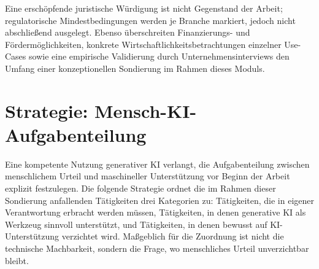 \documentclass[a4paper,11pt]{article}
\begin{document}
Eine erschöpfende juristische Würdigung ist nicht Gegenstand der Arbeit;
regulatorische Mindestbedingungen werden je Branche markiert, jedoch
nicht abschließend ausgelegt. Ebenso überschreiten Finanzierungs- und
Fördermöglichkeiten, konkrete Wirtschaftlichkeitsbetrachtungen einzelner
Use-Cases sowie eine empirische Validierung durch Unternehmensinterviews
den Umfang einer konzeptionellen Sondierung im Rahmen dieses Moduls.

\section{Strategie: Mensch-KI-Aufgabenteilung}

Eine kompetente Nutzung generativer KI verlangt, die Aufgabenteilung
zwischen menschlichem Urteil und maschineller Unterstützung vor Beginn
der Arbeit explizit festzulegen. Die folgende Strategie ordnet die im
Rahmen dieser Sondierung anfallenden Tätigkeiten drei Kategorien zu:
Tätigkeiten, die in eigener Verantwortung erbracht werden müssen,
Tätigkeiten, in denen generative KI als Werkzeug sinnvoll unterstützt,
und Tätigkeiten, in denen bewusst auf KI-Unterstützung verzichtet wird.
Maßgeblich für die Zuordnung ist nicht die technische Machbarkeit,
sondern die Frage, wo menschliches Urteil unverzichtbar bleibt.
\end{document}
